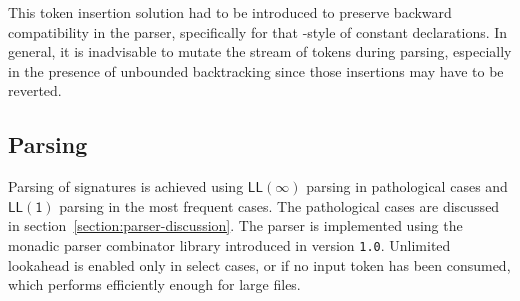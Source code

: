 This token insertion solution had to be introduced to preserve backward compatibility in the parser, specifically for that \Twelf-style of constant declarations.
In general, it is inadvisable to mutate the stream of tokens during parsing, especially in the presence of unbounded backtracking since those insertions may have to be reverted.

\subsection{Parsing}

Parsing of \Beluga signatures is achieved using $ \mathsf{LL(\infty)} $ parsing in pathological cases and $ \mathsf{LL(1)} $ parsing in the most frequent cases.
The pathological cases are discussed in section~\ref{section:parser-discussion}.
The parser is implemented using the monadic parser combinator library introduced in \Beluga version \texttt{1.0}.
Unlimited lookahead is enabled only in select cases, or if no input token has been consumed, which performs efficiently enough for large \Beluga files.

